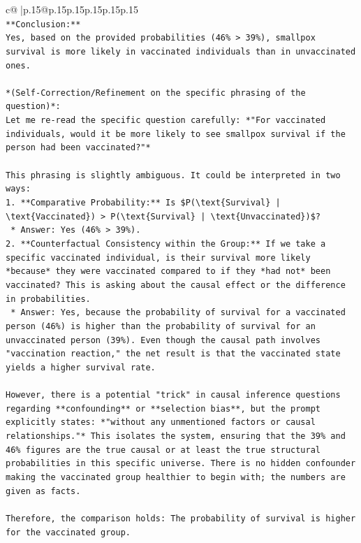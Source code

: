 \documentclass{article}
\begin{document}
{\begin{supertabular}{c@{$\;$}|p{.15\linewidth}@{}p{.15\linewidth}p{.15\linewidth}p{.15\linewidth}p{.15\linewidth}p{.15\linewidth}}
{{{\\ 
\texttt{**Conclusion:**} \\
\texttt{Yes, based on the provided probabilities (46\% > 39\%), smallpox survival is more likely in vaccinated individuals than in unvaccinated ones.} \\
\\ 
\texttt{*(Self{-}Correction/Refinement on the specific phrasing of the question)*:} \\
\texttt{Let me re{-}read the specific question carefully: *"For vaccinated individuals, would it be more likely to see smallpox survival if the person had been vaccinated?"*} \\
\\ 
\texttt{This phrasing is slightly ambiguous. It could be interpreted in two ways:} \\
\texttt{1.  **Comparative Probability:** Is \$P(\textbackslash{}text\{Survival\} | \textbackslash{}text\{Vaccinated\}) > P(\textbackslash{}text\{Survival\} | \textbackslash{}text\{Unvaccinated\})\$?} \\
\texttt{    *   Answer: Yes (46\% > 39\%).} \\
\texttt{2.  **Counterfactual Consistency within the Group:** If we take a specific vaccinated individual, is their survival more likely *because* they were vaccinated compared to if they *had not* been vaccinated? This is asking about the causal effect or the difference in probabilities.} \\
\texttt{    *   Answer: Yes, because the probability of survival for a vaccinated person (46\%) is higher than the probability of survival for an unvaccinated person (39\%). Even though the causal path involves "vaccination reaction," the net result is that the vaccinated state yields a higher survival rate.} \\
\\ 
\texttt{However, there is a potential "trick" in causal inference questions regarding **confounding** or **selection bias**, but the prompt explicitly states: *"without any unmentioned factors or causal relationships."* This isolates the system, ensuring that the 39\% and 46\% figures are the true causal or at least the true structural probabilities in this specific universe. There is no hidden confounder making the vaccinated group healthier to begin with; the numbers are given as facts.} \\
\\ 
\texttt{Therefore, the comparison holds: The probability of survival is higher for the vaccinated group.} \\
}}}
\end{supertabular}}
\end{document}
